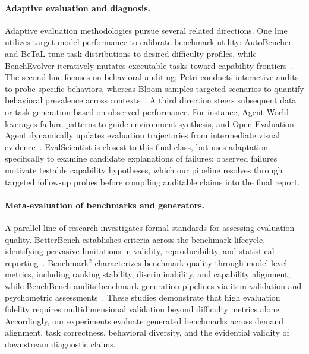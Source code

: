 \documentclass{article} %
\begin{document}
\paragraph{Adaptive evaluation and diagnosis.}
Adaptive evaluation methodologies pursue several related directions. One line utilizes target-model performance to calibrate benchmark utility: AutoBencher and BeTaL tune task distributions to desired difficulty profiles, while BenchEvolver iteratively mutates executable tasks toward capability frontiers~\citep{li2025autobencher,betal2025,benchevolver2026}. The second line focuses on behavioral auditing; Petri conducts interactive audits to probe specific behaviors, whereas Bloom samples targeted scenarios to quantify behavioral prevalence across contexts~\citep{fronsdal2025petri,bloom2025}. A third direction steers subsequent data or task generation based on observed performance. For instance, Agent-World leverages failure patterns to guide environment synthesis, and Open Evaluation Agent dynamically updates evaluation trajectories from intermediate visual evidence~\citep{dong2026agentworld,openevaluationagent2026}. EvalScientist is closest to this final class, but uses adaptation specifically to examine candidate explanations of failures: observed failures motivate testable capability hypotheses, which our pipeline resolves through targeted follow-up probes before compiling auditable claims into the final report.

\paragraph{Meta-evaluation of benchmarks and generators.}
A parallel line of research investigates formal standards for assessing evaluation quality. BetterBench establishes criteria across the benchmark lifecycle, identifying pervasive limitations in validity, reproducibility, and statistical reporting~\citep{reuel2024betterbench}. Benchmark$^2$ characterizes benchmark quality through model-level metrics, including ranking stability, discriminability, and capability alignment, while BenchBench audits benchmark generation pipelines via item validation and psychometric assessments~\citep{benchmark2_2026,benchbench2026}. These studies demonstrate that high evaluation fidelity requires multidimensional validation beyond difficulty metrics alone. Accordingly, our experiments evaluate generated benchmarks across demand alignment, task correctness, behavioral diversity, and the evidential validity of downstream diagnostic claims.
	
\end{document}
